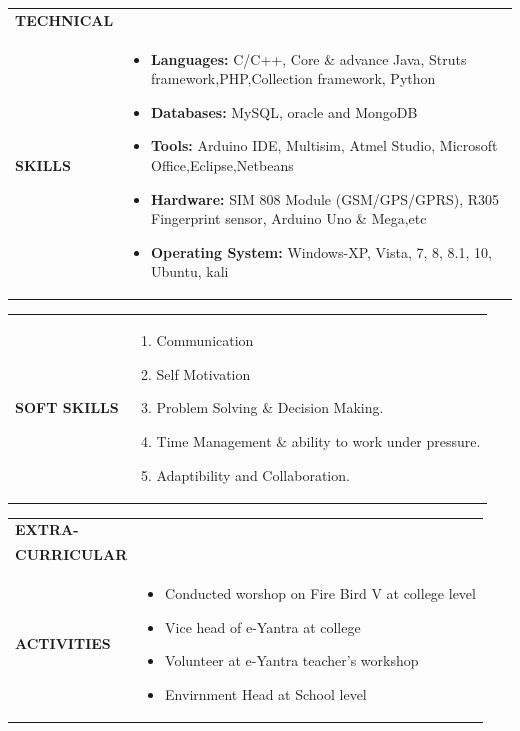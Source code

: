 \documentclass{article}
\begin{document}
\begin{table}[h]
    \begin{tabular}{l  p{}} 
      \textbf{\Large{TECHNICAL}} \\  \textbf{\Large{SKILLS}}& 
	\begin{itemize}
	\item \textbf{Languages: } C/C++, Core \& advance Java, Struts framework,PHP,Collection framework, Python
	\item \textbf{Databases: } MySQL, oracle and MongoDB
	\item \textbf{Tools: }Arduino IDE, Multisim, Atmel Studio, Microsoft Office,Eclipse,Netbeans
	\item \textbf{Hardware: }SIM 808 Module (GSM/GPS/GPRS), R305 Fingerprint sensor, Arduino Uno \& Mega,etc
	\item \textbf{Operating System: }Windows-XP, Vista, 7, 8, 8.1, 10, Ubuntu, kali
   	\end{itemize} 
    \end{tabular}
\end{table}

\begin{table}[h!]
    \begin{tabular}{l  p{}} 
      \textbf{\Large{SOFT SKILLS}} & 
	\begin{enumerate}
	\item Communication
	\item Self Motivation
	\item Problem Solving \& Decision Making.
	\item Time Management \& ability to work under pressure.
	\item Adaptibility and Collaboration.
   	\end{enumerate} 
    \end{tabular}
\end{table}

\begin{table}[h]
    \begin{tabular}{l  p{}} 
      \textbf{\Large{EXTRA-}} \\  \textbf{\Large{CURRICULAR}}\\ \textbf{\Large{ACTIVITIES}}&
	\begin{itemize}	
	\item Conducted worshop on Fire Bird V at college level
	\item Vice head of e-Yantra at college
	\item Volunteer at e-Yantra teacher's workshop	
	\item Envirnment Head at School level
   	\end{itemize} 
    \end{tabular}
\end{table}
\end{document}
